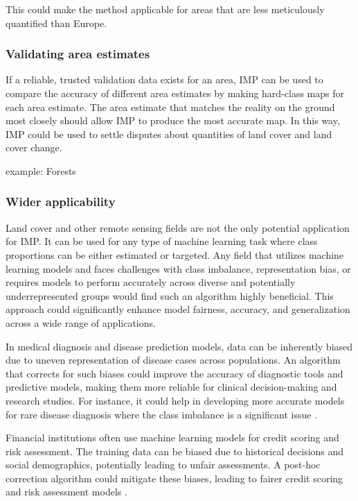             This could make the method applicable for areas that are less meticulously quantified than Europe.
        
        \subsubsection{Validating area estimates}
            If a reliable, trusted validation data exists for an area, IMP can be used to compare the accuracy of different area estimates by making hard-class maps for each area estimate. The area estimate that matches the reality on the ground most closely should allow IMP to produce the most accurate map.
            In this way, IMP could be used to settle disputes about quantities of land cover and land cover change.

            example: Forests

        \subsubsection{Wider applicability}
            Land cover and other remote sensing fields are not the only potential application for IMP. It can be used for any type of machine learning task where class proportions can be either estimated or targeted. Any field that utilizes machine learning models and faces challenges with class imbalance, representation bias, or requires models to perform accurately across diverse and potentially underrepresented groups would find such an algorithm highly beneficial. This approach could significantly enhance model fairness, accuracy, and generalization across a wide range of applications.

            In medical diagnosis and disease prediction models, data can be inherently biased due to uneven representation of disease cases across populations. An algorithm that corrects for such biases could improve the accuracy of diagnostic tools and predictive models, making them more reliable for clinical decision-making and research studies. For instance, it could help in developing more accurate models for rare disease diagnosis where the class imbalance is a significant issue \citep{weiss2004mining,krawczyk2016learning}.

            Financial institutions often use machine learning models for credit scoring and risk assessment. The training data can be biased due to historical decisions and social demographics, potentially leading to unfair assessments. A post-hoc correction algorithm could mitigate these biases, leading to fairer credit scoring and risk assessment models \citep{chen2018why, kamiran2012data}.

